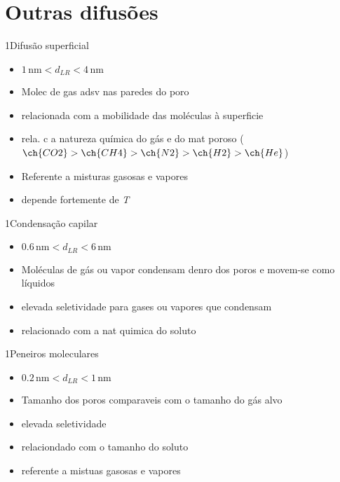 \documentclass[\mainfilename]{subfiles}
\begin{document}
\part*{Outras difusões}

\begin{sectionBox}1{Difusão superficial} %
    
    \begin{itemize}
        \item \(
            1\,\unit{\nano\metre}
            < d_{LR}
            < 4\,\unit{\nano\metre}\)
        \item Molec de gas adsv nas paredes do poro
        \item relacionada com a mobilidade das moléculas à superficie
        \item rela. c a natureza química do gás e do mat poroso 
        (\(
            \ch{CO2}
            >\ch{CH4}
            >\ch{N2}
            >\ch{H2}
            >\ch{He}
        \))
        \item Referente a misturas gasosas e vapores
        \item depende fortemente de \textit{T}
    \end{itemize}
\end{sectionBox}

\begin{sectionBox}1{Condensação capilar} %
    \begin{itemize}
        \item \(
            0.6\,\unit{\nano\metre}
            < d_{LR}
            < 6\,\unit{\nano\metre}
        \)
        \item Moléculas de gás ou vapor condensam denro dos poros e movem-se como líquidos
        \item elevada seletividade para gases ou vapores que condensam
        \item relacionado com a nat quimica do soluto
    \end{itemize}
\end{sectionBox}

\begin{sectionBox}1{Peneiros moleculares} %
    \begin{itemize}
        \item \(
            0.2\,\unit{\nano\metre}
            < d_{LR}
            < 1\,\unit{\nano\metre}
        \)
        \item Tamanho dos poros comparaveis com o tamanho do gás alvo
        \item elevada seletividade
        \item relaciondado com o tamanho do soluto
        \item referente a mistuas gasosas e vapores
    \end{itemize}
\end{sectionBox}
\end{document}
